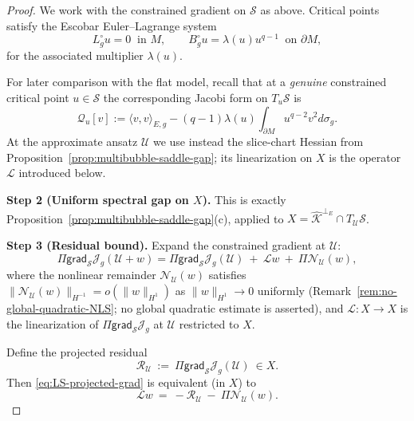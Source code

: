 \documentclass[11pt,reqno,a4paper]{amsart}
\numberwithin{equation}{section}
\theoremstyle{plain}
\theoremstyle{remark}
\theoremstyle{plain}
\begin{document}
\begin{proof}
We work with the constrained gradient on $\mathcal S$ as above. Critical points satisfy the Escobar Euler--Lagrange system
\[
L_g^\circ u=0\ \text{ in }M,\qquad B_g^\circ u=\lambda(u)u^{q-1}\ \text{ on }\partial M,
\]
for the associated multiplier $\lambda(u)$.

For later comparison with the flat model, recall that at a \emph{genuine} constrained critical point
$u\in\mathcal S$ the corresponding Jacobi form on $T_u\mathcal S$ is
\begin{equation}\label{eq:Jacobi-form}
\mathcal Q_{u}[v]
:=\langle v,v\rangle_{E,g}
-(q-1)\lambda(u)\int_{\partial M} u^{q-2}v^2d\sigma_g.
\end{equation}
At the approximate ansatz $\mathcal U$ we use instead the slice-chart Hessian from
Proposition~\ref{prop:multibubble-saddle-gap}; its linearization on $X$ is the operator
$\mathcal L$ introduced below.

\medskip\noindent
\textbf{Step 2 (Uniform spectral gap on $X$).}
This is exactly Proposition~\ref{prop:multibubble-saddle-gap}(c), applied to
$X=\widehat{\mathcal K}^{\perp_E}\cap T_{\mathcal U}\mathcal S$.

\medskip\noindent
\textbf{Step 3 (Residual bound).}
Expand the constrained gradient at $\mathcal U$:
\[
\Pi\mathsf{grad}_{\mathcal S}\mathcal J_g(\mathcal U+w)
=\Pi\mathsf{grad}_{\mathcal S}\mathcal J_g(\mathcal U)\ +\ \mathcal L w\ +\ \Pi\mathcal N_{\mathcal U}(w),
\]
where the nonlinear remainder $\mathcal N_{\mathcal U}(w)$ satisfies
$\|\mathcal N_{\mathcal U}(w)\|_{H^{-1}}=o(\|w\|_{H^1})$ as $\|w\|_{H^1}\to0$
uniformly (Remark~\ref{rem:no-global-quadratic-NLS}; no global quadratic
estimate is asserted), and $\mathcal L:X\to X$ is the linearization of
$\Pi\mathsf{grad}_{\mathcal S}\mathcal J_g$ at $\mathcal U$ restricted to $X$.

Define the projected residual
\[
\mathcal R_{\mathcal U}\ :=\ \Pi\mathsf{grad}_{\mathcal S}\mathcal J_g(\mathcal U)\ \in X.
\]
Then \eqref{eq:LS-projected-grad} is equivalent (in $X$) to
\[
\mathcal L w\ =\ -\mathcal R_{\mathcal U}\ -\ \Pi\mathcal N_{\mathcal U}(w).
\]


\end{proof}
\end{document}
